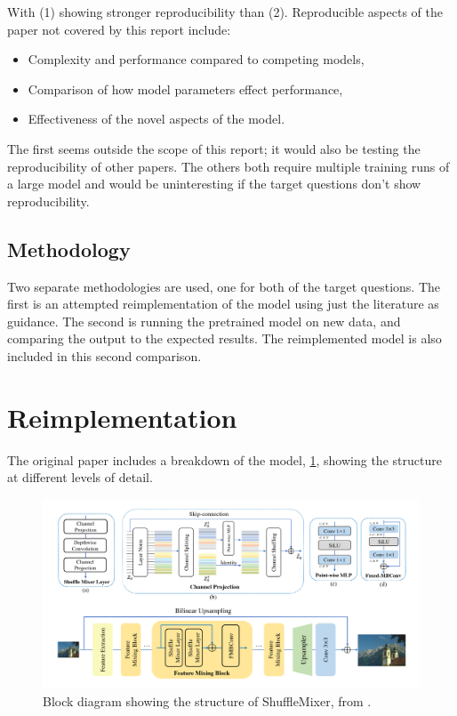 \documentclass{article}
\begin{document}
    With (1) showing stronger reproducibility than (2). Reproducible aspects of the paper not covered by this report include:

    \begin{itemize}
        \item Complexity and performance compared to competing models,
        \item Comparison of how model parameters effect performance,
        \item Effectiveness of the novel aspects of the model. 
    \end{itemize}

    The first seems outside the scope of this report; it would also be testing the reproducibility of other papers. The others both require multiple training runs of a large model and would be uninteresting if the target questions don't show reproducibility.

    \subsection{Methodology}

    Two separate methodologies are used, one for both of the target questions. The first is an attempted reimplementation of the model using just the literature as guidance. The second is running the pretrained model on new data, and comparing the output to the expected results. The reimplemented model is also included in this second comparison.

    \section{Reimplementation} \label{sec: reimpl}

    The original paper includes a breakdown of the model, \cref{fig:original_block_diagram}, showing the structure at different levels of detail. 

    \begin{figure}
    \centering
    \includegraphics[width=\textwidth]{block diagram.png}
    \caption{Block diagram showing the structure of ShuffleMixer, from \citet{sun2022shufflemixer}.} \label{fig:original_block_diagram}
    \end{figure}
\end{document}
